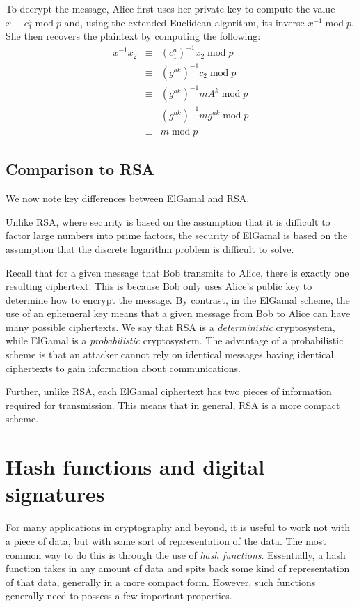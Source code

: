 \documentclass{book}
\theoremstyle{plain}
\theoremstyle{definition}
\renewcommand{\mod}{\operatorname{mod}}
\renewcommand{\mod}{\operatorname{mod}}
\begin{document}
To decrypt the message, Alice first uses her private key to compute the value $x \equiv c_1^a \mod p$ and, using the extended Euclidean algorithm, its inverse $x^{-1} \mod p$. She then recovers the plaintext by computing the following:
\begin{eqnarray*}
x^{-1}x_2 &\equiv& (c_1^a)^{-1}x_2 \mod p \\
&\equiv& (g^{ak})^{-1}c_2 \mod p \\
&\equiv& (g^{ak})^{-1}mA^k \mod p \\
&\equiv& (g^{ak})^{-1}mg^{ak} \mod p \\
&\equiv& m \mod p
\end{eqnarray*}

\section{Comparison to RSA}
We now note key differences between ElGamal and RSA.

Unlike RSA, where security is based on the assumption that it is difficult to factor large numbers into prime factors, the security of ElGamal is based on the assumption that the discrete logarithm problem is difficult to solve.

Recall that for a given message that Bob transmits to Alice, there is exactly one resulting ciphertext. This is because Bob only uses Alice's public key to determine how to encrypt the message. By contrast, in the ElGamal scheme, the use of an ephemeral key means that a given message from Bob to Alice can have many possible ciphertexts. We say that RSA is a {\it deterministic} cryptosystem, while ElGamal is a {\it probabilistic} cryptosystem. The advantage of a probabilistic scheme is that an attacker cannot rely on identical messages having identical ciphertexts to gain information about communications.

Further, unlike RSA, each ElGamal ciphertext has two pieces of information required for transmission. This means that in general, RSA is a more compact scheme.

\chapter{Hash functions and digital signatures}
For many applications in cryptography and beyond, it is useful to work not with a piece of data, but with some sort of representation of the data. The most common way to do this is through the use of {\it hash functions}. Essentially, a hash function takes in any amount of data and spits back some kind of representation of that data, generally in a more compact form. However, such functions generally need to possess a few important properties.
\end{document}
